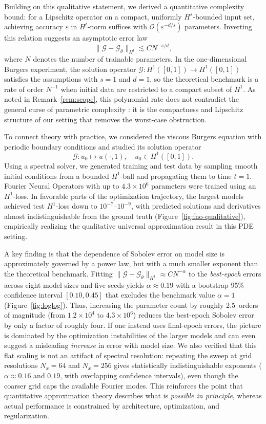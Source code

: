 \documentclass[11pt]{article}
\newcommand{\sweepdecades}{2.5}
\theoremstyle{plain}
\theoremstyle{definition}
\theoremstyle{remark}
\begin{document}
Building on this qualitative statement, we derived a quantitative complexity
bound: for a Lipschitz operator on a compact, uniformly $H^s$-bounded input
set, achieving accuracy $\varepsilon$ in $H^t$-norm suffices with
$\mathcal{O}(\varepsilon^{-d/s})$ parameters. Inverting this relation suggests
an asymptotic error law
\[
\| \mathcal{G} - \mathcal{G}_\theta \|_{H^t} \lesssim C N^{-s/d},
\]
where $N$ denotes the number of trainable parameters. In the one-dimensional
Burgers experiment, the solution operator
$\mathcal{G}: H^1([0,1]) \to H^1([0,1])$ satisfies the assumptions with $s=1$
and $d=1$, so the theoretical benchmark is a rate of order $N^{-1}$ when
initial data are restricted to a compact subset of $H^1$. As noted in
Remark~\ref{rem:scope}, this polynomial rate does not contradict the general
curse of parametric complexity \citep{lanthaler2026parametric}: it is the
compactness and Lipschitz structure of our setting that removes the worst-case
obstruction.

To connect theory with practice, we considered the viscous Burgers equation
with periodic boundary conditions and studied its solution operator
\[
\mathcal{G}: u_0 \mapsto u(\cdot,1), \quad u_0 \in H^1([0,1]).
\]
Using a spectral solver, we generated training and test data by sampling
smooth initial conditions from a bounded $H^1$-ball and propagating them to
time $t=1$. Fourier Neural Operators with up to $4.3\times 10^6$ parameters
were trained using an $H^1$-loss. In favorable parts of the optimization
trajectory, the largest models achieved test $H^1$-loss down to
$10^{-7}$--$10^{-9}$, with predicted solutions and derivatives almost
indistinguishable from the ground truth (Figure~\ref{fig:fno-qualitative}),
empirically realizing the qualitative universal approximation result in this
PDE setting.

A key finding is that the dependence of Sobolev error on model size is
approximately governed by a power law, but with a much smaller exponent than
the theoretical benchmark. Fitting
$\| \mathcal{G} - \mathcal{G}_\theta \|_{H^1} \approx C N^{-\alpha}$ to the
\emph{best-epoch} errors across eight model sizes and five seeds yields
$\alpha \approx 0.19$ with a bootstrap 95\% confidence interval $[0.10, 0.45]$
that excludes the benchmark value $\alpha = 1$ (Figure~\ref{fig:loglog}). Thus,
increasing the parameter count by roughly \sweepdecades\ orders of magnitude
(from $1.2\times 10^4$ to $4.3\times 10^6$) reduces the best-epoch Sobolev error
by only a factor of roughly four. If one instead uses final-epoch errors, the
picture is dominated by the optimization instabilities of the larger models and
can even suggest a misleading \emph{increase} in error with model size. We also
verified that this flat scaling is not an artifact of spectral resolution:
repeating the sweep at grid resolutions
$N_x = 64$ and $N_x = 256$ gives statistically indistinguishable exponents
($\alpha \approx 0.16$ and $0.19$, with overlapping confidence intervals), even
though the coarser grid caps the available Fourier modes. This reinforces the
point that quantitative approximation theory describes what is \emph{possible
in principle}, whereas actual performance is constrained by architecture,
optimization, and regularization.
\end{document}
